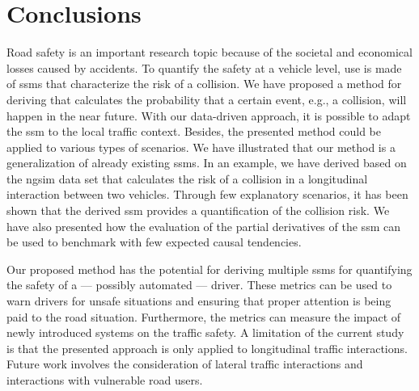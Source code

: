 \section{Conclusions}
\label{sec:conclusions}

Road safety is an important research topic because of the societal and economical losses caused by accidents.
To quantify the safety at a vehicle level, use is made of \acp{ssm} that characterize the risk of a collision. 
We have proposed a method for deriving  that calculates the probability that a certain event, e.g., a collision, will happen in the near future.
With our data-driven approach, it is possible to adapt the \ac{ssm} to the local traffic context.
Besides, the presented method could be applied to various types of scenarios.
We have illustrated that our method is a generalization of already existing \acp{ssm}.
In an example, we have derived  based on the \ac{ngsim} data set that calculates the risk of a collision in a longitudinal interaction between two vehicles.
Through few explanatory scenarios, it has been shown that the derived \ac{ssm} provides a quantification of the collision risk.
We have also presented how the evaluation of the partial derivatives of the \ac{ssm} can be used to benchmark  with few expected causal tendencies.

Our proposed method has the potential for deriving multiple \acp{ssm} for quantifying the safety of a --- possibly automated --- driver.
These metrics can be used to warn drivers for unsafe situations and ensuring that proper attention is being paid to the road situation.
Furthermore, the metrics can measure the impact of newly introduced systems on the traffic safety.
A limitation of the current study is that the presented approach is only applied to longitudinal traffic interactions. 
Future work involves the consideration of lateral traffic interactions and interactions with vulnerable road users. 
